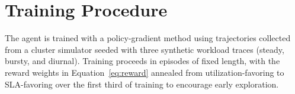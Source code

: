 \section{Training Procedure}
The agent is trained with a policy-gradient method using trajectories
collected from a cluster simulator seeded with three synthetic workload
traces (steady, bursty, and diurnal). Training proceeds in episodes of
fixed length, with the reward weights in Equation~\ref{eq:reward} annealed
from utilization-favoring to SLA-favoring over the first third of training
to encourage early exploration.
